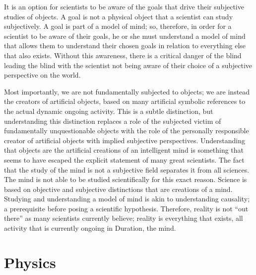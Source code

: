 It is an option for scientists to be aware of the goals that drive
their subjective studies of objects.  A goal is not a physical object
that a scientist can study subjectively.  A goal is part of a model of
mind; so, therefore, in order for a scientist to be aware of their
goals, he or she must understand a model of mind that allows them to
understand their chosen goals in relation to everything else that also
exists.  Without this awareness, there is a critical danger of the
blind leading the blind with the scientist not being aware of their
choice of a subjective perspective on the world.

  Most
importantly, we are not fundamentally subjected to objects; we are
instead the creators of artificial objects, based on many artificial
symbolic references to the actual dynamic ongoing activity.  This is a
subtle distinction, but understanding this distinction replaces a role
of the subjected victim of fundamentally unquestionable objects with
the role of the personally responsible creator of artificial objects
with implied subjective perspectives.  Understanding that objects are
the artificial creations of an intelligent mind is something that
seems to have escaped the explicit statement of many great scientists.
The fact that the study of the mind is not a subjective field
separates it from all sciences.  The mind is not able to be studied
scientifically for this exact reason.  Science is based on objective
and subjective distinctions that are creations of a mind.  Studying
and understanding a model of mind is akin to understanding causality;
a prerequisite before posing a scientific hypothesis.  Therefore,
reality is not ``out there'' as many scientists currently believe;
reality is everything that exists, all activity that is currently
ongoing in Duration, the mind.

\section{Physics}


